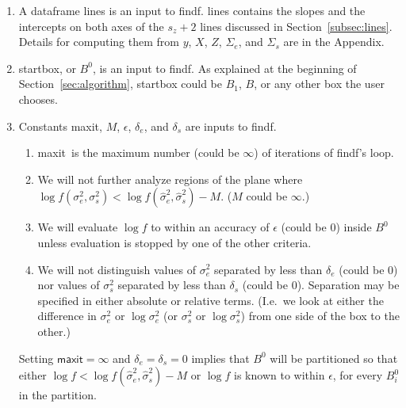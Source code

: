 \documentclass{report}
\newcommand{\textcompute}{\textsf}
\newcommand{\RL}{f}
\newcommand{\logRL}{\log\RL}
\newcommand{\sigssq}{\sigma_s^2}
\newcommand{\sigesq}{\sigma_e^2}
\newcommand{\sshat}{\hat\sigma^2_e,\hat\sigma^2_s}
\newcommand{\logRLss}{\logRL(\sigesq,\sigssq)}
\newcommand{\maxit}{\textcompute{maxit}}
\begin{document}
\begin{enumerate}
\item A dataframe \textcompute{lines} is an input to \textcompute{findf}.  \textcompute{lines} contains the slopes
  and the intercepts on both axes of the $s_z+2$ lines discussed in Section~\ref{subsec:lines}.
  Details for computing them from $y$, $X$, $Z$, $\Sigma_e$, and $\Sigma_s$ are in the Appendix.
\item \textcompute{startbox}, or $B^0$, is an input to \textcompute{findf}.  As explained at the beginning of
  Section~\ref{sec:algorithm}, \textcompute{startbox} could be $B_1$, $B$, or any other box the user chooses.
\item Constants \maxit, $M$, $\epsilon$, $\delta_e$, and $\delta_s$ are inputs to \textcompute{findf}.
	\begin{enumerate}[label=(\alph*)]
	\item \maxit\ is the maximum number (could be $\infty$) of iterations of
		\textcompute{findf}'s loop.
	\item We will not further analyze regions of the plane where
		$\logRLss < \logRL(\sshat) - M$.  ($M$ could be $\infty$.)
	\item We will evaluate $\logRL$ to within an accuracy of $\epsilon$ (could be 0) inside $B^0$
	         unless evaluation is stopped by one of the other criteria.
	\item We will not distinguish values of $\sigesq$ separated by less
		than $\delta_e$ (could be 0) nor values of $\sigssq$ separated by
		less than $\delta_s$ (could be 0).  Separation may be specified
		in either absolute or relative terms. (I.e.\ we look at either the difference
		in $\sigesq$ or $\log\sigesq$ (or $\sigssq$ or $\log\sigssq$) from one
		side of the box to the other.)
	\end{enumerate}
  Setting $\maxit = \infty$ and $\delta_e = \delta_s = 0$ implies that $B^0$ will be partitioned so that either
  $\logRL < \logRL(\sshat) - M$ or $\logRL$ is known to within $\epsilon$, for every $B^0_i$ in the partition.
  

\end{enumerate}
\end{document}
